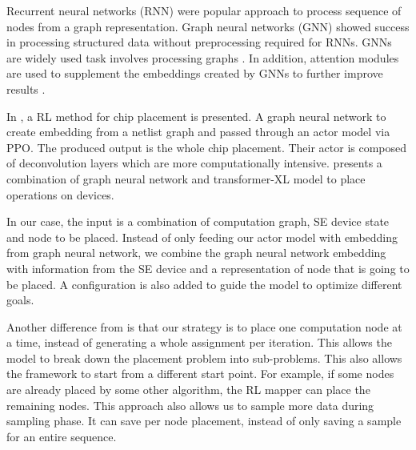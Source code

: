 Recurrent neural networks (RNN) \cite{hochreiter1996lstm} were popular approach to process sequence of nodes from a graph representation. 
Graph neural networks (GNN) \cite{gori2005new} showed success in processing structured data without preprocessing required for RNNs.
GNNs are widely used task involves processing graphs \cite{Zhou_compileGNN, zhou2019gdp}. 
In addition, attention modules are used to supplement the embeddings created by GNNs to further improve results \cite{addanki2019placeto}.

In \cite{mirhoseini2020chip}, a RL method for chip placement is presented. 
A graph neural network to create embedding from a netlist graph and passed through an actor model via PPO. 
The produced output is the whole chip placement. 
Their actor is composed of deconvolution layers which are more computationally intensive. 
\cite{zhou2019gdp} presents a combination of graph neural network and transformer-XL model to place operations on devices. 

In our case, the input is a combination of computation graph, SE device state and node to be placed. 
Instead of only feeding our actor model with embedding from graph neural network, we combine the graph neural network embedding with information from the SE device and a representation of node that is going to be placed. 
A configuration is also added to guide the model to optimize different goals.  

Another difference from \cite{zhou2019gdp}  is that our strategy is to place one computation node at a time, instead of generating a whole assignment per iteration. 
This allows the model to break down the placement problem into sub-problems. 
This also allows the framework to start from a different start point. For example, if some nodes are already placed by some other algorithm, the RL mapper can place the remaining nodes. 
This approach also allows us to sample more data during sampling phase. 
It can save per node placement, instead of only saving a sample for an entire sequence.  